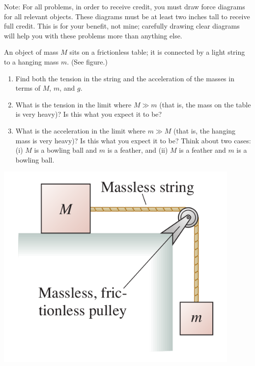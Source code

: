 \documentclass[12pt]{article}
\begin{document}
\Large
\centerline{}
\normalsize
\centerline{}

{\sc Note:} For all problems, in order to receive credit, you must draw force diagrams for all relevant objects. These diagrams must be at least two inches tall to receive full credit.
This is for your benefit, not mine; carefully drawing clear diagrams will help you with these problems more than anything else.

\vspace{1em}

\begin{enumerate}


  \begin{minipage}{0.7\textwidth}
\item  An object of mass $M$ sits on a frictionless table; it is connected by
   a light string to a hanging mass $m$. (See figure.)
\begin{enumerate}
\item Find both the tension in the string and the acceleration of the masses in terms of $M$, $m$, and $g$.
\item What is the tension in the limit where $M \gg m$ (that is, the mass on the table is very heavy)? Is this what you expect it to be?
\item What is the acceleration in the limit where $m \gg M$ (that is, the hanging mass is very heavy)? Is this what you expect it to be? Think about two cases: (i) $M$ is a bowling ball and $m$ is a feather, and (ii) $M$ is a feather and $m$ is a bowling ball.
\end{enumerate}
  \end{minipage}
  \begin{minipage}{0.3\textwidth}
\centerline{\includegraphics[width=0.9\textwidth]{problem736.png}}
  \end{minipage}


\end{enumerate}
\end{document}
